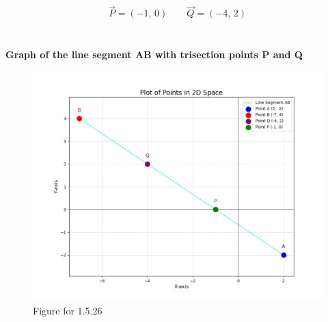 \documentclass[journal]{IEEEtran}
\begin{document}
    
\begin{align}
{\vec{P} = (-1,\,0)\qquad \vec{Q} = (-4,\,2)}
\end{align}
\\
\\
\bigskip
\vspace{5em}
\textbf{Graph of the line segment AB with trisection points P and Q}
\begin{figure}[H]
    \centering
    \includegraphics[width=1\columnwidth]{Figs/1.jpg}
    \caption{Figure for 1.5.26}
    \label{fig1}
\end{figure}
\end{document}
